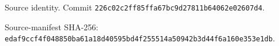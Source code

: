\par\smallskip\begingroup\footnotesize\raggedright
\noindent Source identity. Commit \texttt{226c02c2ff85ffa67bc9d27811b64062e02607d4}.\par
\noindent Source-manifest SHA-256:\\
\texttt{edaf9ccf4f048850ba61a18d40595bd4}\allowbreak\texttt{f255514a50942b3d44f6a160e353e1db}.\par\endgroup
